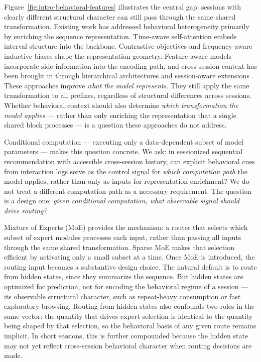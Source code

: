 \documentclass[sigconf,review,anonymous]{acmart}
\begin{document}
Figure~\ref{fig:intro-behavioral-features} illustrates the central gap: sessions with clearly different structural character can still pass through the same shared transformation. Existing work has addressed behavioral heterogeneity primarily by enriching the sequence representation. Time-aware self-attention \cite{li2020tisasrec} embeds interval structure into the backbone. Contrastive objectives \cite{qiu2022duorec} and frequency-aware inductive biases \cite{du2023fearec,shin2024bsarec} shape the representation geometry. Feature-aware models \cite{zhang2019fdsa,xie2022difsr} incorporate side information into the encoding path, and cross-session context has been brought in through hierarchical architectures \cite{quadrana2017hrnn} and session-aware extensions \cite{bauer2024hybridsession}. These approaches improve \emph{what the model represents}. They still apply the same transformation to all prefixes, regardless of structural differences across sessions. Whether behavioral context should also determine \emph{which transformation the model applies} — rather than only enriching the representation that a single shared block processes — is a question these approaches do not address.

Conditional computation — executing only a data-dependent subset of model parameters — makes this question concrete. We ask: in sessionized sequential recommendation with accessible cross-session history, can explicit behavioral cues from interaction logs serve as the control signal for \emph{which computation path} the model applies, rather than only as inputs for representation enrichment? We do not treat a different computation path as a necessary requirement. The question is a design one: \emph{given conditional computation, what observable signal should drive routing?}

Mixture of Experts (MoE) \cite{jacobs1991adaptive,jordan1994hme} provides the mechanism: a router that selects which subset of expert modules processes each input, rather than passing all inputs through the same shared transformation. Sparse MoE \cite{shazeer2017moe,fedus2022switch,du2022glam,zoph2022stmoe} makes that selection efficient by activating only a small subset at a time. Once MoE is introduced, the routing input becomes a substantive design choice. The natural default is to route from hidden states, since they summarize the sequence. But hidden states are optimized for prediction, not for encoding the behavioral regime of a session — its observable structural character, such as repeat-heavy consumption or fast exploratory browsing. Routing from hidden states also confounds two roles in the same vector: the quantity that drives expert selection is identical to the quantity being shaped by that selection, so the behavioral basis of any given route remains implicit. In short sessions, this is further compounded because the hidden state may not yet reflect cross-session behavioral character when routing decisions are made.
\end{document}
